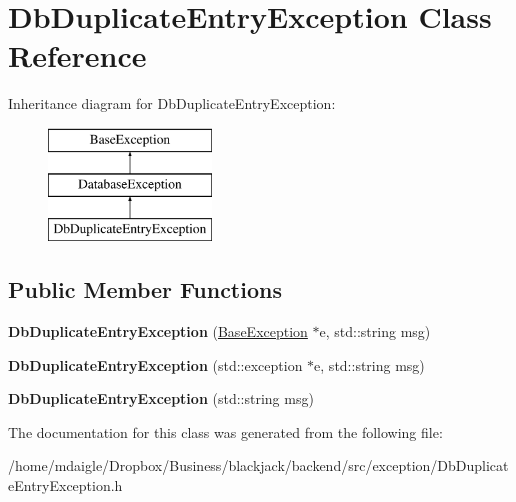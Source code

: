 \hypertarget{classDbDuplicateEntryException}{
\section{\-Db\-Duplicate\-Entry\-Exception \-Class \-Reference}
\label{db/d69/classDbDuplicateEntryException}
}
\-Inheritance diagram for \-Db\-Duplicate\-Entry\-Exception\-:\begin{figure}[H]
\begin{center}
\leavevmode
\includegraphics[height=3.000000cm]{db/d69/classDbDuplicateEntryException}
\end{center}
\end{figure}
\subsection*{\-Public \-Member \-Functions}
\begin{DoxyCompactItemize}
\item 
\hypertarget{classDbDuplicateEntryException_a3917e761c61143101291f0d97bf83d47}{
{\bfseries \-Db\-Duplicate\-Entry\-Exception} (\hyperlink{classBaseException}{\-Base\-Exception} $\ast$e, std\-::string msg)}
\label{db/d69/classDbDuplicateEntryException_a3917e761c61143101291f0d97bf83d47}

\item 
\hypertarget{classDbDuplicateEntryException_afbd52a2b5af4fb9042f992c38cfbe0bd}{
{\bfseries \-Db\-Duplicate\-Entry\-Exception} (std\-::exception $\ast$e, std\-::string msg)}
\label{db/d69/classDbDuplicateEntryException_afbd52a2b5af4fb9042f992c38cfbe0bd}

\item 
\hypertarget{classDbDuplicateEntryException_a2b468a896e3192f01dc853ac0c4b3a98}{
{\bfseries \-Db\-Duplicate\-Entry\-Exception} (std\-::string msg)}
\label{db/d69/classDbDuplicateEntryException_a2b468a896e3192f01dc853ac0c4b3a98}

\end{DoxyCompactItemize}


\-The documentation for this class was generated from the following file\-:\begin{DoxyCompactItemize}
\item 
/home/mdaigle/\-Dropbox/\-Business/blackjack/backend/src/exception/\-Db\-Duplicate\-Entry\-Exception.\-h\end{DoxyCompactItemize}
